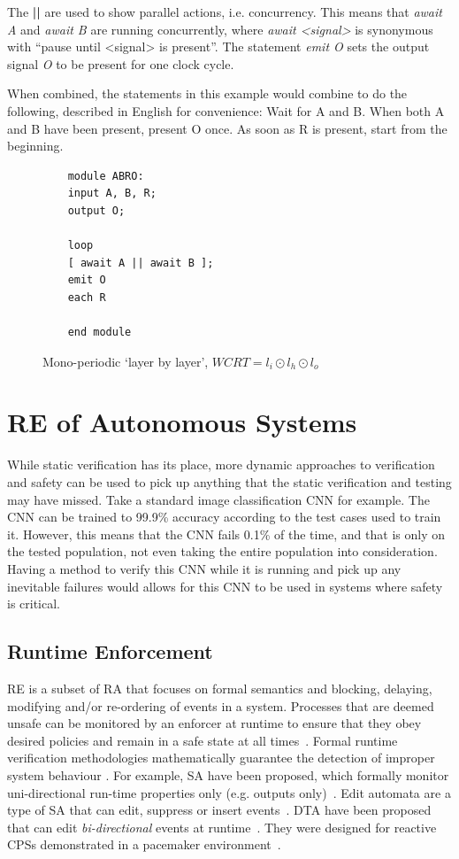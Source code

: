 The \textbf{||} are used to show parallel actions, i.e. concurrency.
This means that \textit{await A} and \textit{await B} are running concurrently, where \textit{await <signal>} is synonymous with ``pause until <signal> is present''.
The statement \textit{emit O} sets the output signal \textit{O} to be present for one clock cycle.

When combined, the statements in this example would combine to do the following, described in English for convenience:
Wait for A and B. 
When both A and B have been present, present O once.
As soon as R is present, start from the beginning.

\begin{figure}
	\begin{lstlisting}
	module ABRO:
	input A, B, R;
	output O;
	
	loop
	[ await A || await B ];
	emit O
	each R
	
	end module
	\end{lstlisting}
	\caption{Mono-periodic `layer by layer', $WCRT = l_i \odot l_h \odot l_o$}
	\label{fig:esterel-abro}
\end{figure}


\section{\acf{RE} of Autonomous Systems}
While static verification has its place, more dynamic approaches to verification and safety can be used to pick up anything that the static verification and testing may have missed.
Take a standard image classification \ac{CNN} for example.
The \ac{CNN} can be trained to 99.9\% accuracy according to the test cases used to train it.
However, this means that the \ac{CNN} fails 0.1\% of the time, and that is only on the tested population, not even taking the entire population into consideration.
Having a method to verify this \ac{CNN} while it is running and pick up any inevitable failures would allows for this \ac{CNN} to be used in systems where safety is critical.

\subsection{Runtime Enforcement}
\ac{RE} is a subset of \ac{RA} that focuses on formal semantics and blocking, delaying, modifying and/or re-ordering of events in a system. 
Processes that are deemed unsafe can be monitored by an enforcer at runtime to ensure that they obey desired policies and remain in a safe state at all times~\cite{theoryRE}. 
Formal runtime verification methodologies mathematically guarantee the detection of improper system behaviour \cite{RuntimeAssuranceForComplexCPS}.
For example, \ac{SA} have been proposed, which formally monitor uni-directional run-time properties only (e.g. outputs only)~\cite{enfsafepol}.
Edit automata are a type of \ac{SA} that can edit, suppress or insert events~\cite{editautomata}. 
\ac{DTA} have been proposed that can edit \textit{bi-directional} events at runtime~\cite{recps}. 
They were designed for reactive \acp{CPS} demonstrated in a pacemaker environment~\cite{recps}. 

